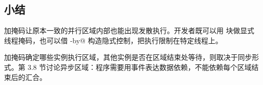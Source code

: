 \subsection*{小结}

加掩码让原本一致的并行区域内部也能出现发散执行。开发者既可以用 \co@inthreads@ 块做显式线程掩码，也可以借 \co@parallel-by@ 构造隐式控制，把执行限制在特定线程上。

加掩码确定哪些实例执行区域，其他实例是否在区域结束处等待，则取决于同步形式。第 3.8 节讨论异步区域：程序需要用事件表达数据依赖，不能依赖每个区域结束后的汇合。
